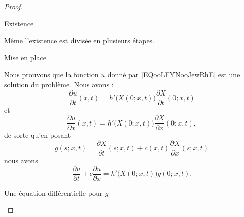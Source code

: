 \begin{proof}
\begin{subproof}
        \item[Existence]

            Même l'existence est divisée en plusieurs étapes.

            \begin{subproof}
                \item[Mise en place]

            Nous prouvons que la fonction \( u\) donné par \eqref{EQooLFYNooJewRhE} est une solution du problème. Nous avons :
            \begin{equation}
                \frac{ \partial u }{ \partial t }(x,t)=h'\big( X(0;x,t) \big)\frac{ \partial X }{ \partial t }(0;x,t)
            \end{equation}
            et
            \begin{equation}
                \frac{ \partial u }{ \partial x }(x,t)=h'\big( X(0;x,t) \big)\frac{ \partial X }{ \partial x }(0;x,t),
            \end{equation}
            de sorte qu'en posant
            \begin{equation}
                g(s;x,t)=\frac{ \partial X }{ \partial t }(s;x,t)+c(x,t)\frac{ \partial X }{ \partial x }(s;x,t)
            \end{equation}
            nous avons
            \begin{equation}
                \frac{ \partial u }{ \partial t }+c\frac{ \partial u }{ \partial x }=h'\big( X(0;x,t) \big)g(0;x,t).
            \end{equation}

        \item[Une équation différentielle pour \( g\)]


\end{subproof}
\end{subproof}
\end{proof}
